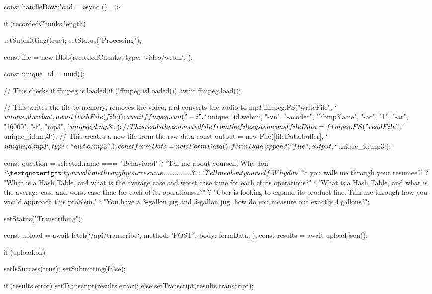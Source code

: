 {  const handleDownload = async () => {
    if (recordedChunks.length) {
      setSubmitting(true);
      setStatus("Processing");

      const file = new Blob(recordedChunks, {
        type: `video/webm`,
      });

      const unique_id = uuid();

      // This checks if ffmpeg is loaded
      if (!ffmpeg.isLoaded()) {
        await ffmpeg.load();
      }

      // This writes the file to memory, removes the video, and converts the audio to mp3
      ffmpeg.FS("writeFile", `${unique_id}.webm`, await fetchFile(file));
      await ffmpeg.run(
        "-i",
        `${unique_id}.webm`,
        "-vn",
        "-acodec",
        "libmp3lame",
        "-ac",
        "1",
        "-ar",
        "16000",
        "-f",
        "mp3",
        `${unique_id}.mp3`,
      );

      // This reads the converted file from the file system
      const fileData = ffmpeg.FS("readFile", `${unique_id}.mp3`);
      // This creates a new file from the raw data
      const output = new File([fileData.buffer], `${unique_id}.mp3`, {
        type: "audio/mp3",
      });

      const formData = new FormData();
      formData.append("file", output, `${unique_id}.mp3`);

      const question =
        selected.name === "Behavioral"
          ? `Tell me about yourself. Why don${`’`}t you walk me through your resume...............?`
          : `Tell me about yourself. Why don${`’`}t you walk me through your resumee?`
          ? "What is a Hash Table, and what is the average case and worst case time for each of its operations?"
          : "What is a Hash Table, and what is the average case and worst case time for each of its operationsss?"
          ? "Uber is looking to expand its product line. Talk me through how you would approach this problem."
          : "You have a 3-gallon jug and 5-gallon jug, how do you measure out exactly 4 gallons?";

      setStatus("Transcribing");

      const upload = await fetch(`/api/transcribe`, {
        method: "POST",
        body: formData,
      });
        const results = await upload.json();

        if (upload.ok) {
          setIsSuccess(true);
          setSubmitting(false);

          if (results.error) {
            setTranscript(results.error);
          } else {
            setTranscript(results.transcript);
          }

}}}}
